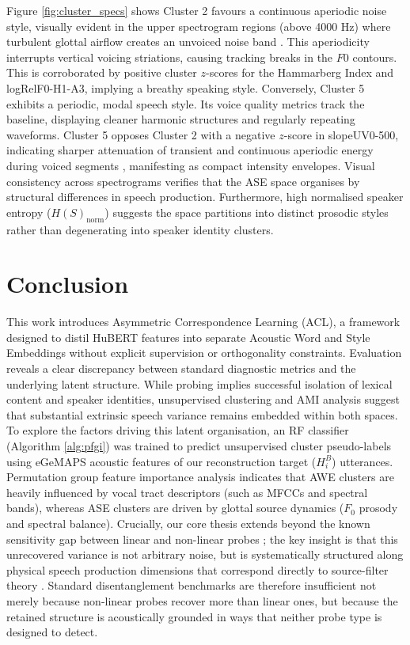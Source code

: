 \documentclass[conference,letterpaper]{IEEEtran}
\begin{document}
Figure \ref{fig:cluster_specs} shows Cluster 2 favours a continuous aperiodic noise style, visually evident in the upper spectrogram regions (above 4000 Hz) where turbulent glottal airflow creates an unvoiced noise band \cite{ogden2023introduction}. This aperiodicity interrupts vertical voicing striations, causing tracking breaks in the $F0$ contours. This is corroborated by positive cluster $z$-scores for the Hammarberg Index and logRelF0-H1-A3, implying a breathy speaking style. Conversely, Cluster 5 exhibits a periodic, modal speech style. Its voice quality metrics track the baseline, displaying cleaner harmonic structures and regularly repeating waveforms. Cluster 5 opposes Cluster 2 with a negative $z$-score in slopeUV0-500, indicating sharper attenuation of transient and continuous aperiodic energy during voiced segments \cite{alipour2012measures}, manifesting as compact intensity envelopes. Visual consistency across spectrograms verifies that the ASE space organises by structural differences in speech production. Furthermore, high normalised speaker entropy ($H(S)_{\text{norm}}$) suggests the space partitions into distinct prosodic styles rather than degenerating into speaker identity clusters.

\vspace{-0.15cm}
\section{Conclusion}

This work introduces Asymmetric Correspondence Learning (ACL), a framework designed to distil HuBERT features into separate Acoustic Word and Style Embeddings without explicit supervision or orthogonality constraints. Evaluation reveals a clear discrepancy between standard diagnostic metrics and the underlying latent structure. While probing implies successful isolation of lexical content and speaker identities, unsupervised clustering and AMI analysis suggest that substantial extrinsic speech variance remains embedded within both spaces. To explore the factors driving this latent organisation, an RF classifier (Algorithm \ref{alg:pfgi}) was trained to predict unsupervised cluster pseudo-labels using eGeMAPS acoustic features of our reconstruction target ($H_i^B$) utterances. Permutation group feature importance analysis indicates that AWE clusters are heavily influenced by vocal tract descriptors (such as MFCCs and spectral bands), whereas ASE clusters are driven by glottal source dynamics ($F_0$ prosody and spectral balance). Crucially, our core thesis extends beyond the known sensitivity gap between linear and non-linear probes \cite{hewitt2019designinginterpretingprobescontrol}; the key insight is that this unrecovered variance is not arbitrary noise, but is systematically structured along physical speech production dimensions that correspond directly to source-filter theory \cite{fant1981source, 10.1093/acrefore/9780199384655.013.894}. Standard disentanglement benchmarks are therefore insufficient not merely because non-linear probes recover more than linear ones, but because the retained structure is acoustically grounded in ways that neither probe type is designed to detect.
\end{document}
